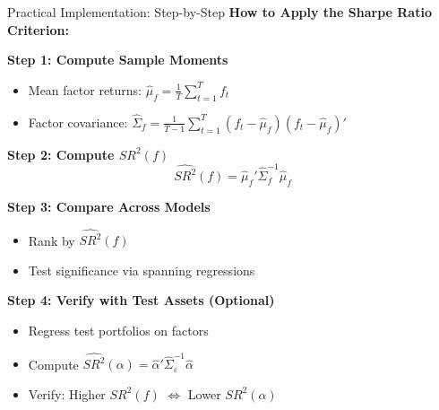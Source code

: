 \documentclass{beamer}
\begin{document}
\begin{frame}{Practical Implementation: Step-by-Step}
    \textbf{How to Apply the Sharpe Ratio Criterion:}
    
    
    \textbf{Step 1: Compute Sample Moments}
    \begin{itemize}
        \item Mean factor returns: $\hat{\mu}_f = \frac{1}{T} \sum_{t=1}^T f_t$
        \item Factor covariance: $\hat{\Sigma}_f = \frac{1}{T-1} \sum_{t=1}^T (f_t - \hat{\mu}_f)(f_t - \hat{\mu}_f)'$
    \end{itemize}
    
    
    \textbf{Step 2: Compute $SR^2(f)$}
    \begin{equation*}
        \widehat{SR^2}(f) = \hat{\mu}_f' \hat{\Sigma}_f^{-1} \hat{\mu}_f
    \end{equation*}
    
    
    \textbf{Step 3: Compare Across Models}
    \begin{itemize}
        \item Rank by $\widehat{SR^2}(f)$
        \item Test significance via spanning regressions
    \end{itemize}
    
    
    \textbf{Step 4: Verify with Test Assets (Optional)}
    \begin{itemize}
        \item Regress test portfolios on factors
        \item Compute $\widehat{SR^2}(\alpha) = \hat{\alpha}' \hat{\Sigma}_\varepsilon^{-1} \hat{\alpha}$
        \item Verify: Higher $SR^2(f)$ $\Leftrightarrow$ Lower $SR^2(\alpha)$
    \end{itemize}
\end{frame}
\end{document}
